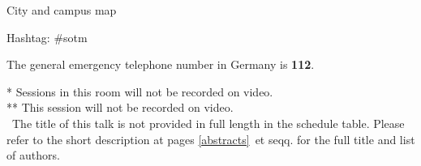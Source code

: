 \vspace*{\contentspace}%
\noindent City and campus map \dotfill \pageref{maps}

\vfill
\noindent
Hashtag: \#sotm

\vspace*{0.8em}%
\noindent
The general emergency telephone number in Germany is \textbf{112}.
\vfill

\small{
\noindent
  \** Sessions in this room will not be recorded on video.\\
  \**\** This session will not be recorded on video.\\
  \diamondSymbol\ The title of this talk is not provided in full length in the schedule table. Please refer to the short description at pages \ref{abstracts}~et seqq. for the full title and list of authors.
}\normalsize


\newpage
